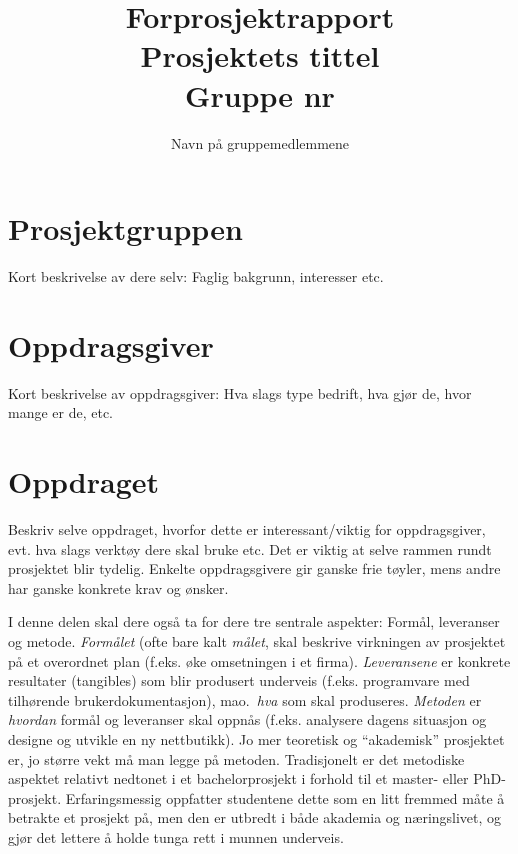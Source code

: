 \documentclass[11pt,a4paper]{report}
\begin{document}
\title{
Forprosjektrapport \\
\vspace{2cm}
Prosjektets tittel\\
Gruppe nr
}
\author{
\LARGE 
Navn på gruppemedlemmene}
\maketitle

\section*{Prosjektgruppen}

Kort beskrivelse av dere selv: Faglig bakgrunn, interesser etc.

\lipsum[1-2]

\section*{Oppdragsgiver}

Kort beskrivelse av oppdragsgiver: Hva slags type bedrift, hva gjør de, hvor mange er de, etc.

\lipsum[3-4]

\section*{Oppdraget}

Beskriv selve oppdraget, hvorfor dette er interessant/viktig for oppdragsgiver, evt. hva slags verktøy dere skal bruke etc. Det er viktig at selve rammen rundt prosjektet blir tydelig. Enkelte oppdragsgivere gir ganske frie tøyler, mens andre har ganske konkrete krav og ønsker.

I denne delen skal dere også ta for dere  tre sentrale aspekter: Formål, leveranser og metode. {\em Formålet} (ofte bare kalt {\em målet}, skal beskrive virkningen av prosjektet på et overordnet plan (f.eks. øke omsetningen i et firma). 
{\em Leveransene} er konkrete resultater (tangibles) som blir produsert underveis (f.eks. programvare med tilhørende brukerdokumentasjon), mao.\ {\em hva} som skal produseres. 
{\em Metoden} er {\em hvordan} formål og leveranser skal oppnås (f.eks. analysere dagens situasjon og designe og utvikle en ny nettbutikk). 
Jo mer teoretisk og ``akademisk'' prosjektet er, jo større vekt må man legge på metoden. Tradisjonelt er det metodiske aspektet relativt nedtonet i et bachelorprosjekt i forhold til et master- eller PhD-prosjekt.
Erfaringsmessig oppfatter studentene dette som en litt fremmed måte å betrakte et prosjekt på, men den er utbredt i både akademia og næringslivet, og gjør det lettere å holde tunga rett i munnen underveis. 
\end{document}

